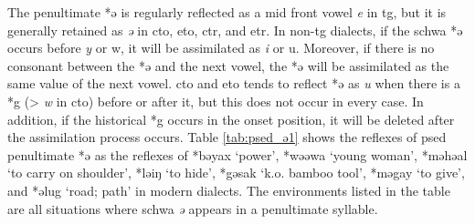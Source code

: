 The penultimate *ə is regularly reflected as a mid front vowel \textit{e} in \acl{tg}, but it is generally retained as \textit{ə} in \acl{cto}, \acl{eto}, \acl{ctr}, and \acl{etr}. In non-\acl{tg} dialects, if the schwa *ə occurs before \textit{y} or {w}, it will be assimilated as \textit{i} or {u}. Moreover, if there is no consonant between the *ə and the next vowel, the *ə will be assimilated as the same value of the next vowel. \acl{cto} and \acl{eto} tends to reflect *ə as \textit{u} when there is a *g (> \textit{w} in \acl{cto}) before or after it, but this does not occur in every case. In addition, if the historical *g occurs in the onset position, it will be deleted after the assimilation process occurs. Table \ref{tab:psed_ə1} shows the reflexes of \acl{psed} penultimate *ə as the reflexes of *bəyax `power', *wəəwa `young woman', *məhəal `to carry on shoulder', *ləiŋ `to hide', *gəsak `k.o. bamboo tool', *məgay `to give', and *əlug `road; path' in modern dialects. The environments listed in the table are all situations where schwa \textit{ə} appears in a penultimate syllable.

